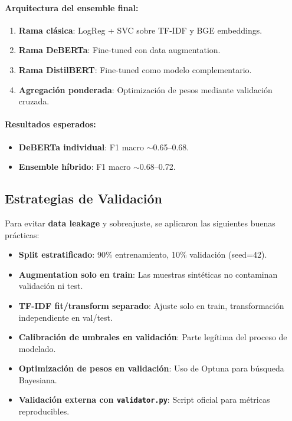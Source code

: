 \paragraph{Arquitectura del ensemble final:}
\begin{enumerate}
    \item \textbf{Rama clásica}: LogReg + SVC sobre TF-IDF y BGE embeddings.
    \item \textbf{Rama DeBERTa}: Fine-tuned con data augmentation.
    \item \textbf{Rama DistilBERT}: Fine-tuned como modelo complementario.
    \item \textbf{Agregación ponderada}: Optimización de pesos mediante validación cruzada.
\end{enumerate}

\paragraph{Resultados esperados:}
\begin{itemize}
    \item \textbf{DeBERTa individual}: F1 macro $\sim$0.65--0.68.
    \item \textbf{Ensemble híbrido}: F1 macro $\sim$0.68--0.72.
\end{itemize}

\subsection{Estrategias de Validación}

Para evitar \textbf{data leakage} y sobreajuste, se aplicaron las siguientes buenas prácticas:

\begin{itemize}
    \item \textbf{Split estratificado}: 90\% entrenamiento, 10\% validación (seed=42).
    \item \textbf{Augmentation solo en train}: Las muestras sintéticas no contaminan validación ni test.
    \item \textbf{TF-IDF fit/transform separado}: Ajuste solo en train, transformación independiente en val/test.
    \item \textbf{Calibración de umbrales en validación}: Parte legítima del proceso de modelado.
    \item \textbf{Optimización de pesos en validación}: Uso de Optuna para búsqueda Bayesiana.
    \item \textbf{Validación externa con \texttt{validator.py}}: Script oficial para métricas reproducibles.
\end{itemize}

